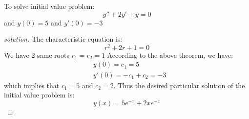 \begin{example}
    To solve initial value problem:
    \[
        y'' + 2y' + y = 0
    \]
    and \(y(0) = 5\) and \(y'(0) = -3\)  
\end{example}
\begin{proof}[solution]
    The characteristic equation is: 
    \[
        r^2 + 2r + 1 = 0
    \]
    We have 2 same roots \(r_1 = r_2 = 1\) 
    According to the above theorem, we have:
    \begin{align*}
        &y(0) = c_1 = 5 \\
        &y'(0) = -c_1 + c_2 = -3
    \end{align*}
    which implies that \(c_1 = 5\) and \(c_2 = 2\).   
    Thus the desired particular solution of the initial value problem is:
    \[
        y(x) = 5e^{-x} + 2xe^{-x}
    \]
\end{proof}